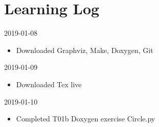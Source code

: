 \chapter{Learning Log}

2019-01-08
\begin{itemize}
  \item Downloaded Graphviz, Make, Doxygen, Git
\end{itemize}

2019-01-09
\begin{itemize}
  \item Downloaded Tex live
\end{itemize}

2019-01-10
\begin{itemize}
  \item Completed T01b Doxygen exercise Circle.py
\end{itemize}

